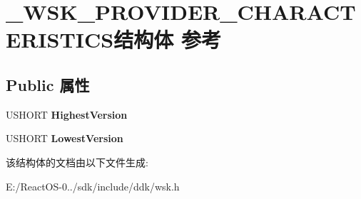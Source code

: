 \hypertarget{struct___w_s_k___p_r_o_v_i_d_e_r___c_h_a_r_a_c_t_e_r_i_s_t_i_c_s}{}\section{\+\_\+\+W\+S\+K\+\_\+\+P\+R\+O\+V\+I\+D\+E\+R\+\_\+\+C\+H\+A\+R\+A\+C\+T\+E\+R\+I\+S\+T\+I\+C\+S结构体 参考}
\label{struct___w_s_k___p_r_o_v_i_d_e_r___c_h_a_r_a_c_t_e_r_i_s_t_i_c_s}
\subsection*{Public 属性}
\begin{DoxyCompactItemize}
\item 
\mbox{\label{struct___w_s_k___p_r_o_v_i_d_e_r___c_h_a_r_a_c_t_e_r_i_s_t_i_c_s_a035815490a030d50f3c71301f7c6faaa}} 
U\+S\+H\+O\+RT {\bfseries Highest\+Version}
\item 
\mbox{\label{struct___w_s_k___p_r_o_v_i_d_e_r___c_h_a_r_a_c_t_e_r_i_s_t_i_c_s_a73287f80a440031982d04ea875f89f23}} 
U\+S\+H\+O\+RT {\bfseries Lowest\+Version}
\end{DoxyCompactItemize}


该结构体的文档由以下文件生成\+:\begin{DoxyCompactItemize}
\item 
E\+:/\+React\+O\+S-\/0../sdk/include/ddk/wsk.\+h\end{DoxyCompactItemize}

